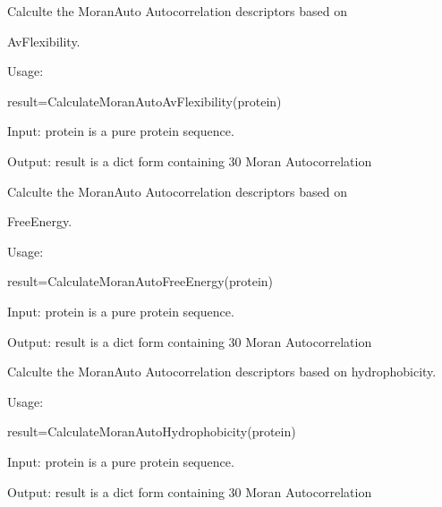 \documentclass[letterpaper,10pt,english]{sphinxmanual}
\begin{document}

\begin{fulllineitems}
\label{reference/Autocorrelation:Autocorrelation.CalculateMoranAutoAvFlexibility}
Calculte the MoranAuto Autocorrelation descriptors based on

AvFlexibility.

Usage:

result=CalculateMoranAutoAvFlexibility(protein)

Input: protein is a pure protein sequence.

Output: result is a dict form containing 30 Moran Autocorrelation

\end{fulllineitems}


\begin{fulllineitems}
\label{reference/Autocorrelation:Autocorrelation.CalculateMoranAutoFreeEnergy}
Calculte the MoranAuto Autocorrelation descriptors based on

FreeEnergy.

Usage:

result=CalculateMoranAutoFreeEnergy(protein)

Input: protein is a pure protein sequence.

Output: result is a dict form containing 30 Moran Autocorrelation

\end{fulllineitems}


\begin{fulllineitems}
\label{reference/Autocorrelation:Autocorrelation.CalculateMoranAutoHydrophobicity}
Calculte the MoranAuto Autocorrelation descriptors based on hydrophobicity.

Usage:

result=CalculateMoranAutoHydrophobicity(protein)

Input: protein is a pure protein sequence.

Output: result is a dict form containing 30 Moran Autocorrelation

\end{fulllineitems}
\end{document}
